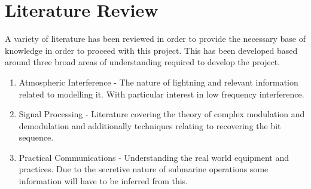 \chapter{Literature Review}

A variety of literature has been reviewed in order to provide the necessary base of knowledge in order to proceed with this project. This has been developed based around three broad areas of understanding required to develop the project.

\begin{enumerate}[i]
    \item Atmospheric Interference - The nature of lightning and relevant information related to modelling it. With particular interest in low frequency interference.
    \item Signal Processing - Literature covering the theory of complex modulation and demodulation and additionally techniques relating to recovering the bit sequence.
    \item Practical Communications - Understanding the real world equipment and practices. Due to the secretive nature of submarine operations some information will have to be inferred from this.
\end{enumerate}

